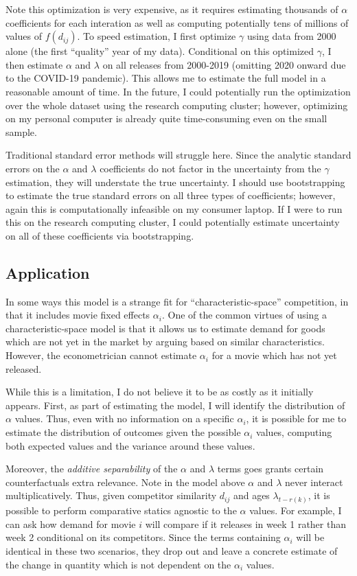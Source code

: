 \documentclass{article}
\begin{document}
Note this optimization is very expensive, as it requires estimating thousands of $\alpha$ coefficients for each interation as well as computing potentially tens of millions of values of $f(d_{ij})$. To speed estimation, I first optimize $\gamma$ using data from 2000 alone (the first ``quality'' year of my data). Conditional on this optimized $\gamma$, I then estimate $\alpha$ and $\lambda$ on all releases from 2000-2019 (omitting 2020 onward due to the COVID-19 pandemic). This allows me to estimate the full model in a reasonable amount of time. In the future, I could potentially run the optimization over the whole dataset using the research computing cluster; however, optimizing on my personal computer is already quite time-consuming even on the small sample.

Traditional standard error methods will struggle here. Since the analytic standard errors on the $\alpha$ and $\lambda$ coefficients do not factor in the uncertainty from the $\gamma$ estimation, they will understate the true uncertainty. I should use bootstrapping to estimate the true standard errors on all three types of coefficients; however, again this is computationally infeasible on my consumer laptop. If I were to run this on the research computing cluster, I could potentially estimate uncertainty on all of these coefficients via bootstrapping. 

\subsection{Application}

In some ways this model is a strange fit for ``characteristic-space'' competition, in that it includes movie fixed effects $\alpha_i$. One of the common virtues of using a characteristic-space model is that it allows us to estimate demand for goods which are not yet in the market by arguing based on similar characteristics. However, the econometrician cannot estimate $\alpha_i$ for a movie which has not yet released.

While this is a limitation, I do not believe it to be as costly as it initially appears. First, as part of estimating the model, I will identify the distribution of $\alpha$ values. Thus, even with no information on a specific $\alpha_i$, it is possible for me to estimate the distribution of outcomes given the possible $\alpha_i$ values, computing both expected values and the variance around these values. 

Moreover, the \emph{additive separability} of the $\alpha$ and $\lambda$ terms goes grants certain counterfactuals extra relevance. Note in the model above $\alpha$ and $\lambda$ never interact multiplicatively. Thus, given competitor similarity $d_{ij}$ and ages $\lambda_{t - r(k)}$, it is possible to perform comparative statics agnostic to the $\alpha$ values. For example, I can ask how demand for movie $i$ will compare if it releases in week 1 rather than week 2 conditional on its competitors. Since the terms containing $\alpha_i$ will be identical in these two scenarios, they drop out and leave a concrete estimate of the change in quantity which is not dependent on the $\alpha_i$ values.
\end{document}
